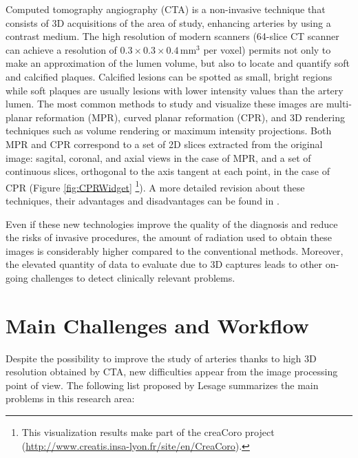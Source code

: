 Computed tomography angiography (CTA) is a non-invasive technique that consists of 3D acquisitions of the area of study, enhancing arteries by using a contrast medium. The high resolution of modern scanners (64-slice CT scanner can achieve a resolution of $0.3 \times 0.3 \times 0.4${\,}mm$^3$ per voxel) permits not only to make an approximation of the lumen volume, but also to locate and quantify soft and calcified plaques. Calcified lesions can be spotted as small, bright regions while soft plaques are usually lesions with lower intensity values than the artery lumen. The most common methods to study and visualize these images are multi-planar reformation (MPR), curved planar reformation (CPR), and 3D rendering techniques such as volume rendering or maximum intensity projections. Both MPR and CPR correspond to a set of 2D slices extracted from the original image: sagital, coronal, and axial views in the case of MPR, and a set of continuous slices, orthogonal to the axis tangent at each point, in the case of CPR (Figure \ref{fig:CPRWidget} \footnote{This visualization results make part of the creaCoro project (\href{http://www.creatis.insa-lyon.fr/site/en/CreaCoro}{http://www.creatis.insa-lyon.fr/site/en/CreaCoro}).}). A more detailed revision about these techniques, their advantages and disadvantages can be found in \citep{Wang2011Thesis}.

Even if these new technologies improve the quality of the diagnosis and reduce the risks of invasive procedures, the amount of radiation used to obtain these images is considerably higher compared to the conventional methods. Moreover, the elevated quantity of data to evaluate due to 3D captures leads to other on-going challenges to detect clinically relevant problems.

\section{Main Challenges and Workflow}
%
Despite the possibility to improve the study of arteries thanks to high 3D resolution obtained by CTA, new difficulties appear from the image processing point of view. The following list proposed by Lesage \citep{Lesage2009Thesis} summarizes the main problems in this research area:

